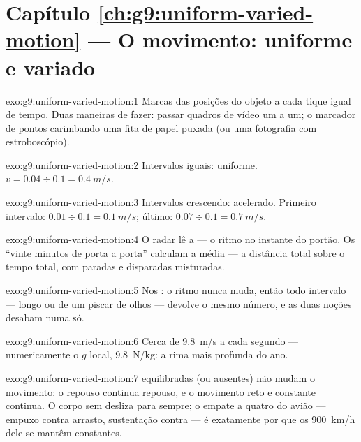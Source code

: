 \section*{Capítulo \ref{ch:g9:uniform-varied-motion} --- O movimento: uniforme e variado}

\begin{solution}{exo:g9:uniform-varied-motion:1}
Marcas das posições do objeto a cada tique igual de tempo. Duas
maneiras de fazer: passar quadros de vídeo um a um; o marcador de
pontos carimbando uma fita de papel puxada (ou uma fotografia com
estroboscópio).
\end{solution}

\begin{solution}{exo:g9:uniform-varied-motion:2}
Intervalos iguais: uniforme. $v = 0.04 \div 0.1 = \qty{0.4}{m/s}$.
\end{solution}

\begin{solution}{exo:g9:uniform-varied-motion:3}
Intervalos crescendo: acelerado. Primeiro intervalo:
$0.01 \div 0.1 = \qty{0.1}{m/s}$; último:
$0.07 \div 0.1 = \qty{0.7}{m/s}$.
\end{solution}

\begin{solution}{exo:g9:uniform-varied-motion:4}
O radar lê a  --- o ritmo no instante do
portão. Os ``vinte minutos de porta a porta'' calculam a média --- a
distância total sobre o tempo total, com paradas e disparadas
misturadas.
\end{solution}

\begin{solution}{exo:g9:uniform-varied-motion:5}
Nos : o ritmo nunca muda, então todo intervalo
--- longo ou de um piscar de olhos --- devolve o mesmo número, e as
duas noções desabam numa só.
\end{solution}

\begin{solution}{exo:g9:uniform-varied-motion:6}
Cerca de \qty{9.8}{m/s} a cada segundo --- numericamente o $g$ local,
\qty{9.8}{N/kg}: a rima mais profunda do ano.
\end{solution}

\begin{solution}{exo:g9:uniform-varied-motion:7}
 equilibradas (ou ausentes) não mudam o movimento: o repouso
continua repouso, e o movimento reto e constante continua. O corpo
sem  desliza para sempre; o empate a quatro do avião ---
empuxo contra arrasto, sustentação contra  --- é exatamente por
que os \qty{900}{km/h} dele se mantêm constantes.
\end{solution}

